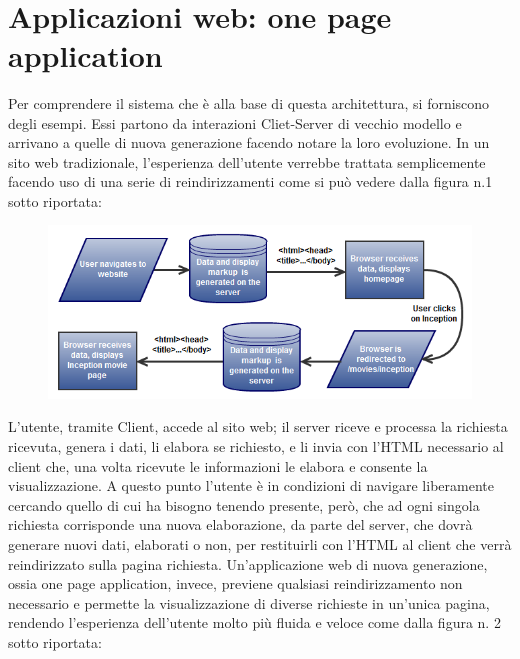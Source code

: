  \section{Applicazioni web: one page application} %
\label{sec:applicazioni_web_one_page_application}

Per comprendere il sistema che è alla base di questa architettura, si forniscono degli esempi. Essi partono da interazioni Cliet-Server di vecchio modello e arrivano a quelle di nuova generazione facendo notare la loro evoluzione. In un sito web tradizionale, l’esperienza dell’utente verrebbe trattata semplicemente facendo uso di una serie di reindirizzamenti come si può vedere dalla figura n.1 sotto riportata:

\begin{figure}[htbp]
\begin{center}
\includegraphics{contents/images/web_app_flow_2_1_}
\end{center}
\caption{}
\label{fig:dessin}
\end{figure}

L’utente, tramite Client, accede al sito web; il server riceve e processa la richiesta ricevuta, genera i dati, li elabora se richiesto, e li invia con l’HTML necessario al client che, una volta ricevute le informazioni le elabora e consente la visualizzazione. A questo punto l’utente è in condizioni di navigare liberamente cercando quello di cui ha bisogno tenendo presente, però, che ad ogni singola richiesta corrisponde una nuova elaborazione, da parte del server, che dovrà generare nuovi dati, elaborati o non, per restituirli con l’HTML al client che verrà reindirizzato sulla pagina richiesta.
Un’applicazione web di nuova generazione, ossia one page application, invece, previene qualsiasi reindirizzamento non necessario e permette la visualizzazione di diverse richieste in un’unica pagina, rendendo l’esperienza dell’utente molto più fluida e veloce come dalla figura n. 2 sotto riportata:

